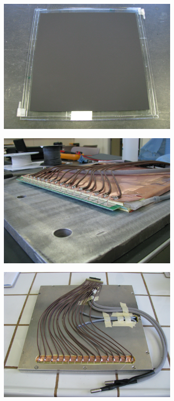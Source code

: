 	\begin{figure}[H]
		\begin{subfigure}{.5\linewidth}
		    \centering
			\includegraphics[width = \linewidth]{fig/chapt6/gRPC-gap.JPG}
			\caption{\label{fig:UGent-gRPC-pictures:A}}
		\end{subfigure}
		\begin{subfigure}{.5\linewidth}
		    \centering
			\includegraphics[width = \linewidth]{fig/chapt6/gRPC-faraday.JPG}
			\caption{\label{fig:UGent-gRPC-pictures:B}}
		\end{subfigure}
		\begin{subfigure}{\linewidth}
		    \centering
			\includegraphics[width = .5\linewidth]{fig/chapt6/gRPC-case.JPG}

\end{subfigure}
\end{figure}
